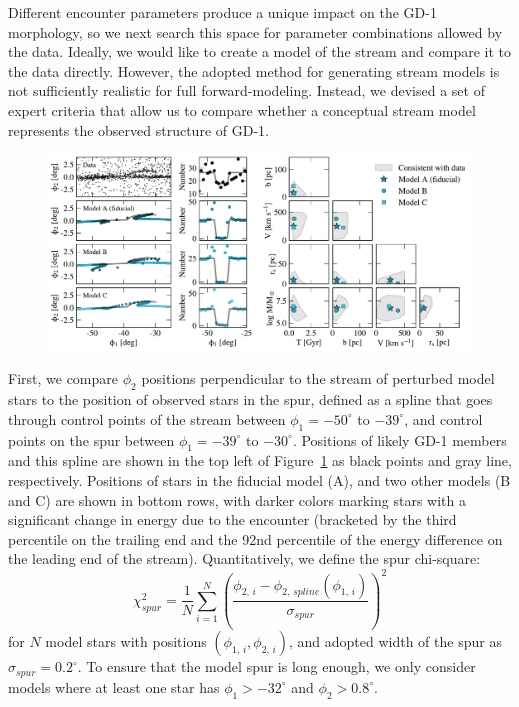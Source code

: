 \documentclass[12pt, modern]{aastex62}
\begin{document}
Different encounter parameters produce a unique impact on the GD-1 morphology, so we next search this space for parameter combinations allowed by the data.
Ideally, we would like to create a model of the stream and compare it to the data directly.
However, the adopted method for generating stream models is not sufficiently realistic for full forward-modeling.
Instead, we devised a set of expert criteria that allow us to compare whether a conceptual stream model represents the observed structure of GD-1.

\begin{figure}
\begin{center}
\includegraphics[width=\textwidth]{param_search.pdf}
\end{center}
\caption{}
\label{fig:corner}
\end{figure}

First, we compare $\phi_2$ positions perpendicular to the stream of perturbed model stars to the position of observed stars in the spur, defined as a spline that goes through control points of the stream between $\phi_1=-50^\circ$ to $-39^\circ$, and control points on the spur between $\phi_1=-39^\circ$ to $-30^\circ$.
Positions of likely GD-1 members and this spline are shown in the top left of Figure~\ref{fig:corner} as black points and gray line, respectively.
Positions of stars in the fiducial model (A), and two other models (B and C) are shown in bottom rows, with darker colors marking stars with a significant change in energy due to the encounter (bracketed by the third percentile on the trailing end and the 92nd percentile of the energy difference on the leading end of the stream). 
Quantitatively, we define the spur chi-square:
\begin{equation}
\chi^2_{spur} = \frac{1}{N}\sum_{i=1}^{N} \left(\frac{\phi_{2,\,i} - \phi_{2,\,spline}(\phi_{1,\,i})}{\sigma_{spur}}\right)^2 
\end{equation}
for $N$ model stars with positions $(\phi_{1,\,i}, \phi_{2,\,i})$, and adopted width of the spur as $\sigma_{spur} = 0.2^\circ$.
To ensure that the model spur is long enough, we only consider models where at least one star has $\phi_1>-32^\circ$ and $\phi_2>0.8^\circ$.
\end{document}
